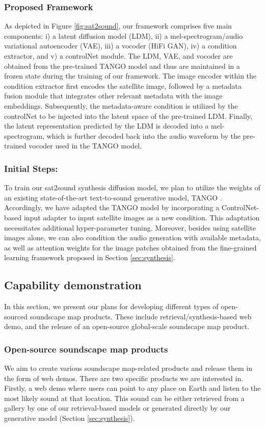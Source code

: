 \subsubsection{Proposed Framework} 
As depicted in Figure \ref{fig:sat2sound}, our framework comprises five main components: i) a latent diffusion model (LDM), ii) a mel-spectrogram/audio variational autoencoder (VAE), iii) a vocoder (HiFi GAN), iv) a condition extractor, and v) a controlNet module. The LDM, VAE, and vocoder are obtained from the pre-trained TANGO model and thus are maintained in a frozen state during the training of our framework. The image encoder within the condition extractor first encodes the satellite image, followed by a metadata fusion module that integrates other relevant metadata with the image embeddings. Subsequently, the metadata-aware condition is utilized by the controlNet to be injected into the latent space of the pre-trained LDM. Finally, the latent representation predicted by the LDM is decoded into a mel-spectrogram, which is further decoded back into the audio waveform by the pre-trained vocoder used in the TANGO model.

\subsubsection{Initial Steps:} 
To train our sat2sound synthesis diffusion model, we plan to utilize the weights of an existing state-of-the-art text-to-sound generative model, TANGO \cite{ghosal2023text}. Accordingly, we have adapted the TANGO model by incorporating a ControlNet-based input adapter to input satellite images as a new condition. This adaptation necessitates additional hyper-parameter tuning. Moreover, besides using satellite images alone, we can also condition the audio generation with available metadata, as well as attention weights for the image patches obtained from the fine-grained learning framework proposed in Section \ref{sec:synthesis}.


\subsection{Capability demonstration}
\label{sec:demos}
In this section, we present our plans for developing different types of open-sourced soundscape map products. These include retrieval/synthesis-based web demo, and the release of an open-source global-scale soundscape map product.


\subsubsection{Open-source soundscape map products}
\label{sec:webdemos}
We aim to create various soundscape map-related products and release them in the form of web demos. There are two specific products we are interested in. Firstly, a web demo where users can point to any place on Earth and listen to the most likely sound at that location. This sound can be either retrieved from a gallery by one of our retrieval-based models or generated directly by our generative model (Section \ref{sec:synthesis}). 


